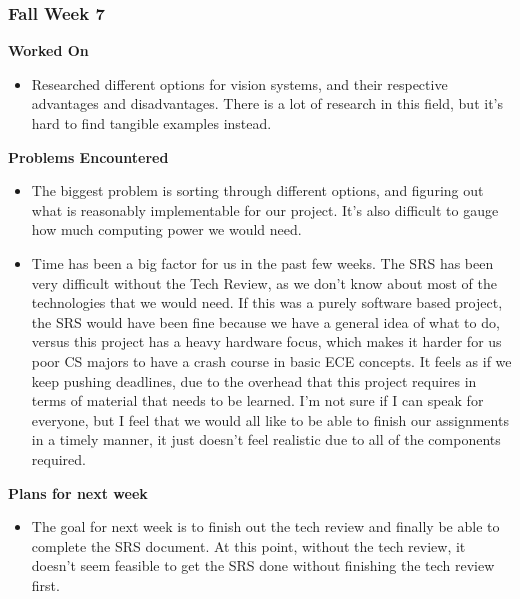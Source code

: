 \documentclass[compsoc,draftclsnofoot,onecolumn,10pt]{IEEEtran}
\begin{document}
    
\subsubsection*{Fall Week 7}
\textbf{Worked On}
\begin{itemize}
    \item Researched different options for vision systems, and their respective advantages and disadvantages. There is a lot of research in this field, but it's hard to find tangible examples instead.
\end{itemize}
\textbf{Problems Encountered}
\begin{itemize}
    \item The biggest problem is sorting through different options, and figuring out what is reasonably implementable for our project. It's also difficult to gauge how much computing power we would need.\\
    \item Time has been a big factor for us in the past few weeks. The SRS has been very difficult without the Tech Review, as we don't know about most of the technologies that we would need. If this was a purely software based project, the SRS would have been fine because we have a general idea of what to do, versus this project has a heavy hardware focus, which makes it harder for us poor CS majors to have a crash course in basic ECE concepts. It feels as if we keep pushing deadlines, due to the overhead that this project requires in terms of material that needs to be learned. I'm not sure if I can speak for everyone, but I feel that we would all like to be able to finish our assignments in a timely manner, it just doesn't feel realistic due to all of the components required.
\end{itemize}
\textbf{Plans for next week}
\begin{itemize}
    \item The goal for next week is to finish out the tech review and finally be able to complete the SRS document. At this point, without the tech review, it doesn't seem feasible to get the SRS done without finishing the tech review first.
\end{itemize}
\end{document}
